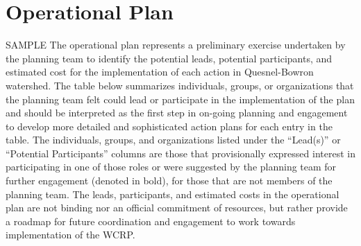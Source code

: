 \documentclass[
  letterpaper,
  DIV=11,
  numbers=noendperiod]{scrreprt}
\begin{document}
\section*{Operational Plan}\label{operational-plan}


SAMPLE The operational plan represents a preliminary exercise undertaken
by the planning team to identify the potential leads, potential
participants, and estimated cost for the implementation of each action
in Quesnel-Bowron watershed. The table below summarizes individuals,
groups, or organizations that the planning team felt could lead or
participate in the implementation of the plan and should be interpreted
as the first step in on-going planning and engagement to develop more
detailed and sophisticated action plans for each entry in the table. The
individuals, groups, and organizations listed under the ``Lead(s)'' or
``Potential Participants'' columns are those that provisionally
expressed interest in participating in one of those roles or were
suggested by the planning team for further engagement (denoted in bold),
for those that are not members of the planning team. The leads,
participants, and estimated costs in the operational plan are not
binding nor an official commitment of resources, but rather provide a
roadmap for future coordination and engagement to work towards
implementation of the WCRP.
\end{document}
